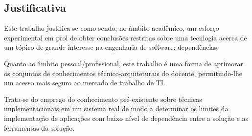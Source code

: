 

\subsection{\textbf{Justificativa}}
    \label{sec:justificativa}
    
    Este trabalho justifica-se como sendo, no âmbito acadêmico, um esforço experimental
    em prol de obter conclusões restritas sobre uma tecnlogia acerca de um tópico de
    grande interesse na engenharia de software: dependências.

    Quanto ao âmbito pessoal/profissional, este trabalho é uma forma de aprimorar os conjuntos
    de conhecimentos técnico-arquiteturais do docente, permitindo-lhe um acesso mais seguro
    ao mercado de trabalho de TI.

    Trata-se do emprego do conhecimento pré-existente sobre técnicas implementacionais
    em um sistema real de modo a determinar os limites da implementação de aplicações
    com baixo nível de dependência entre a solução e as ferramentas da solução.


    

